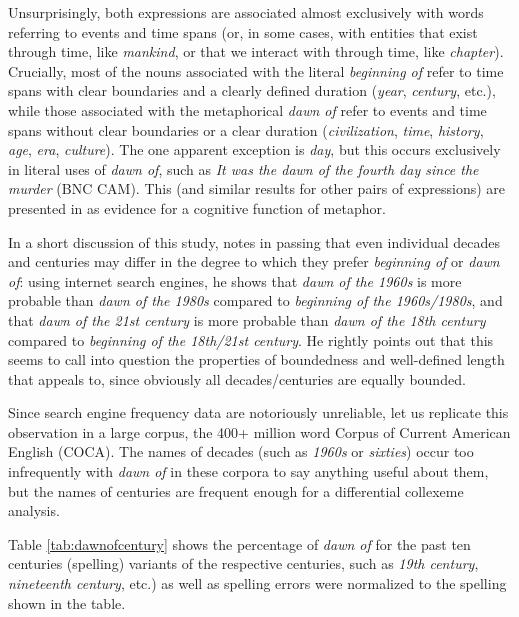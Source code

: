 Unsurprisingly, both expressions are associated almost exclusively with words referring to events and time spans (or, in some cases, with entities that exist through time, like \textit{mankind}, or that we interact with through time, like \textit{chapter}). Crucially, most of the nouns associated with the literal \textit{beginning of} refer to time spans with clear boundaries and a clearly defined duration (\textit{year}, \textit{century}, etc.), while those associated with the metaphorical \textit{dawn of} refer to events and time spans without clear boundaries or a clear duration (\textit{civilization}, \textit{time}, \textit{history}, \textit{age}, \textit{era}, \textit{culture}). The one apparent exception is \textit{day}, but this occurs exclusively in literal uses of \textit{dawn of}, such as \textit{It was the dawn of the fourth day since the murder} (BNC CAM). This (and similar results for other pairs of expressions) are  presented in \citet{stefanowitsch_function_2005} as evidence for a cognitive function of metaphor.

In a short discussion of this study, \citet{liberman_what_2005} notes in passing that even individual decades and centuries may differ in the degree to which they prefer \textit{beginning of} or \textit{dawn of}: using internet search engines, he shows that \textit{dawn of the 1960s} is more probable than \textit{dawn of the 1980s} compared to \textit{beginning of the 1960s/1980s}, and that \textit{dawn of the 21st century} is more probable than \textit{dawn of the 18th century} compared to \textit{beginning of the 18th/21st century}. He rightly points out that this seems to call into question the properties of boundedness and well-defined length that \citet{stefanowitsch_function_2005} appeals to, since obviously all decades/centuries are equally bounded.

Since search engine frequency data are notoriously unreliable, let us replicate this observation in a large corpus, the 400+ million word Corpus of Current American English (COCA). The names of decades (such as \textit{1960s} or \textit{sixties}) occur too infrequently with \textit{dawn of} in these corpora to say anything useful about them, but the names of centuries are frequent enough for a differential collexeme analysis.

Table \ref{tab:dawnofcentury} shows the percentage of \textit{dawn of} for the past ten centuries (spelling) variants of the respective centuries, such as \textit{19th century}, \textit{nineteenth century}, etc.) as well as spelling errors were normalized to the spelling shown in the table.

